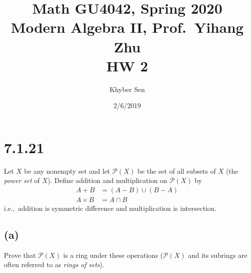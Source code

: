 \documentclass[fleqn]{article}
\title{
Math GU4042, Spring 2020 \\
Modern Algebra II, Prof.\ Yihang Zhu \\
HW 2
}
\author{Khyber Sen}
\date{2/6/2019}
\begin{document}
    
    \maketitle
    
    \section{7.1.21}
    Let $X$ be any nonempty set and let $\mathcal{P}(X)$ be the set of all subsets of $X$ (the \textit{power set} of $X$).  Define addition and multiplication on $\mathcal{P}(X)$ by
    \begin{align}
        A + B &= (A - B) \cup (B - A) \\
        A \times B &= A \cap B
    \end{align}
    i.e.,\ addition is symmetric difference and multiplication is intersection.
        
        \subsection{(a)}
        Prove that $\mathcal{P}(X)$ is a ring under these operations ($\mathcal{P}(X)$ and its subrings are often referred to as \textit{rings of sets}).
            
\end{document}
